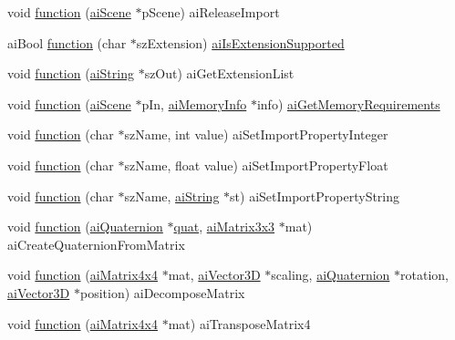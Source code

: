 \begin{DoxyCompactItemize}
void \hyperlink{namespaceassimp_1_1api_a5400a71b2a39a12fb0b227326ce3ba04}{function} (\hyperlink{structai_scene}{ai\+Scene} $\ast$p\+Scene) ai\+Release\+Import
\item 
ai\+Bool \hyperlink{namespaceassimp_1_1api_a2ebfde55e5343eecec6442cf6ad4b542}{function} (char $\ast$sz\+Extension) \hyperlink{_assimp_8cpp_ae1d3a0603764b44b77aad1a464d888a1}{ai\+Is\+Extension\+Supported}
\item 
void \hyperlink{namespaceassimp_1_1api_a57acdbc9025a5c6ee4175a17d51167ee}{function} (\hyperlink{structassimp_1_1types_1_1ai_string}{ai\+String} $\ast$sz\+Out) ai\+Get\+Extension\+List
\item 
void \hyperlink{namespaceassimp_1_1api_ad2c942ec30e33d9ca7b6c8af7ca9d510}{function} (\hyperlink{structai_scene}{ai\+Scene} $\ast$p\+In, \hyperlink{structassimp_1_1types_1_1ai_memory_info}{ai\+Memory\+Info} $\ast$info) \hyperlink{_assimp_8cpp_afbe064a84a03a81226b6d4c807502104}{ai\+Get\+Memory\+Requirements}
\item 
void \hyperlink{namespaceassimp_1_1api_ae5aec5ad6156334848d90dc2f6395b15}{function} (char $\ast$sz\+Name, int value) ai\+Set\+Import\+Property\+Integer
\item 
void \hyperlink{namespaceassimp_1_1api_a5a00f4be28c9dec7bbdc4f85b9d253de}{function} (char $\ast$sz\+Name, float value) ai\+Set\+Import\+Property\+Float
\item 
void \hyperlink{namespaceassimp_1_1api_a4acf426c7e49cb0e1a7e7f485c73fbb6}{function} (char $\ast$sz\+Name, \hyperlink{structassimp_1_1types_1_1ai_string}{ai\+String} $\ast$st) ai\+Set\+Import\+Property\+String
\item 
void \hyperlink{namespaceassimp_1_1api_a97b2f6d110170d49f686d7c1d2e9f003}{function} (\hyperlink{structai_quaternion}{ai\+Quaternion} $\ast$\hyperlink{classquat}{quat}, \hyperlink{structai_matrix3x3}{ai\+Matrix3x3} $\ast$mat) ai\+Create\+Quaternion\+From\+Matrix
\item 
void \hyperlink{namespaceassimp_1_1api_aa65fdf29e38e679125b128d514d06365}{function} (\hyperlink{structai_matrix4x4}{ai\+Matrix4x4} $\ast$mat, \hyperlink{structai_vector3_d}{ai\+Vector3\+D} $\ast$scaling, \hyperlink{structai_quaternion}{ai\+Quaternion} $\ast$rotation, \hyperlink{structai_vector3_d}{ai\+Vector3\+D} $\ast$position) ai\+Decompose\+Matrix
\item 
void \hyperlink{namespaceassimp_1_1api_a629a05a39dc232ccf6ce5eb87e5ad24e}{function} (\hyperlink{structai_matrix4x4}{ai\+Matrix4x4} $\ast$mat) ai\+Transpose\+Matrix4
\item 

\end{DoxyCompactItemize}
